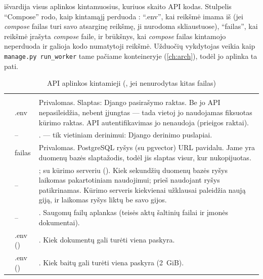  išvardija visus aplinkos kintamuosius, kuriuos skaito API kodas. Stulpelis
\enquote{Compose} rodo, kaip kintamąjį perduoda : \enquote{.env}, kai
reikšmė imama iš  (jei \textit{compose} failas turi savo atsarginę reikšmę, ji
nurodoma skliaustuose), \enquote{failas}, kai reikšmė įrašyta \textit{compose} faile, ir
brūkšnys, kai \textit{compose} failas kintamojo neperduoda ir galioja kodo numatytoji reikšmė.
Užduočių vykdytojas veikia kaip \texttt{manage.py run\_worker} tame pačiame konteineryje
(\cref{ch:arch}), todėl jo aplinka ta pati.

\begin{xltabular}{\textwidth}{@{}L{40mm}L{21mm}Y@{}}
\caption{API aplinkos kintamieji (, jei nenurodytas kitas
failas)}\label{tab:config:api}\\
\toprule
{} &  &  \\
\midrule
\endfirsthead
\toprule
{} &  &  \\
\midrule
\endhead
\bottomrule
\endlastfoot
{} & .env & Privalomas. Slaptas: Django pasirašymo raktas. Be jo API nepasileidžia, nebent įjungtas  --- tada vietoj jo naudojamas fiksuotas kūrimo raktas. API autentifikavimas jo nenaudoja (prieigos raktai). \\
 & -- & .  --- tik vietiniam derinimui: Django derinimo puslapiai. \\
 & failas & Privalomas. PostgreSQL ryšys (su pgvector) URL pavidalu. Jame yra duomenų bazės slaptažodis, todėl jis slaptas visur, kur nukopijuotas. \\
 & -- & ;  su kūrimo serveriu (). Kiek sekundžių duomenų bazės ryšys laikomas pakartotiniam naudojimui; prieš naudojant ryšys patikrinamas. Kūrimo serveris kiekvienai užklausai paleidžia naują giją, ir laikomas ryšys liktų be savo gijos. \\
 & -- & . Saugomų failų aplankas (teisės aktų šaltinių failai ir įmonės dokumentai). \\
 & .env () & . Kiek dokumentų gali turėti viena paskyra. \\
 & .env () & . Kiek baitų gali turėti viena paskyra (2~GiB). \\

\end{xltabular}
